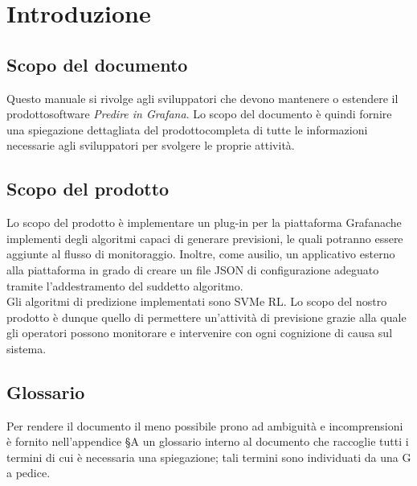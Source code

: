 \section{Introduzione}
\subsection{Scopo del documento}
Questo manuale si rivolge agli sviluppatori che devono mantenere o estendere il prodotto\glosp software \textit{Predire in Grafana}. Lo scopo del documento è quindi fornire una spiegazione dettagliata del prodotto\glosp completa di tutte le informazioni necessarie agli sviluppatori per svolgere le proprie attività.

\subsection{Scopo del prodotto}
Lo scopo del prodotto è implementare un plug-in per la piattaforma Grafana\glosp che implementi degli algoritmi capaci di generare previsioni, le quali potranno essere aggiunte al flusso di monitoraggio. Inoltre, come ausilio, un applicativo esterno alla piattaforma in grado di creare un file JSON di configurazione adeguato tramite l'addestramento del suddetto algoritmo. \\
Gli algoritmi di predizione implementati sono SVM\glosp e RL\glo.
Lo scopo del nostro prodotto è dunque quello di permettere un'attività di previsione grazie alla quale gli operatori possono monitorare e intervenire con ogni cognizione di causa sul sistema.

\subsection{Glossario}
Per rendere il documento il meno possibile prono ad ambiguità e incomprensioni è fornito nell'appendice §A un glossario interno al documento che raccoglie tutti i termini di cui è necessaria una spiegazione; tali termini sono individuati da una G a pedice.

